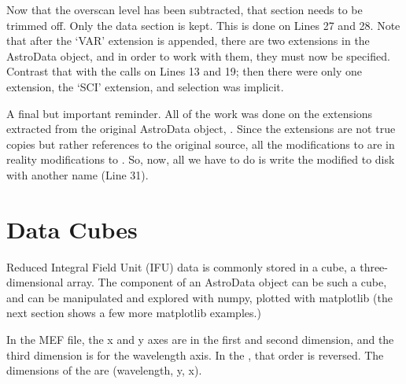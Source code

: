 \documentclass[letterpaper,10pt,english]{sphinxmanual}
\begin{document}
Now that the overscan level has been subtracted, that section needs to be
trimmed off.  Only the data section is kept.  This is done on Lines 27 and 28.
Note that after the `VAR' extension is appended, there are two extensions in
the AstroData object, and in order to work with them, they must now be
specified.  Contrast that with the calls on Lines 13 and 19; then there were
only one extension, the `SCI' extension, and selection was implicit.

A final but important reminder.  All of the work was done on the extensions
extracted from the original AstroData object, .  Since the extensions
are not true copies but rather references to the original source, all the
modifications to  are in reality modifications to .  So, now, all
we have to do is write the modified  to disk with another name (Line 31).


\section{Data Cubes}
\label{data:data-cubes}
Reduced Integral Field Unit (IFU) data is commonly stored in a cube, a
three-dimensional array.  The  component of an AstroData object can
be such a cube, and can be manipulated and explored with numpy, plotted with
matplotlib (the next section shows a few more matplotlib examples.)

In the MEF file, the x and y axes are in the first and second dimension, and
the third dimension is for the wavelength axis. In the , that order
is reversed.  The dimensions of the  are (wavelength, y, x).
\end{document}
